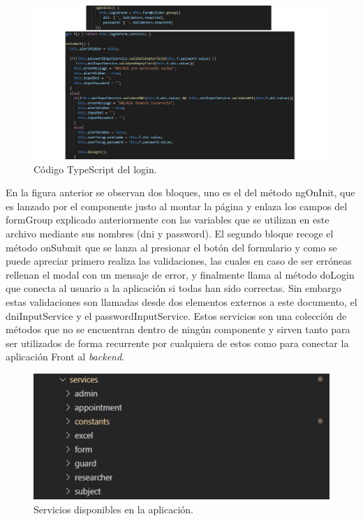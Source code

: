    \begin{figure}[h]
    \centering
     \includegraphics[width=1\textwidth]{images/loginTS.jpg}
    \caption{Código TypeScript del login.}
    \end{figure}
    \FloatBarrier
    
    En la figura anterior se observan dos bloques, uno es el del método ngOnInit, que es lanzado por el componente justo al montar la página y enlaza los campos del formGroup explicado anteriormente con las variables que se utilizan en este archivo mediante sus nombres (dni y password). El segundo bloque recoge el método onSubmit que se lanza al presionar el botón del formulario y como se puede apreciar primero realiza las validaciones, las cuales en caso de ser erróneas rellenan el modal con un mensaje de error, y finalmente llama al método doLogin que conecta al usuario a la aplicación si todas han sido correctas. Sin embargo estas validaciones son llamadas desde dos elementos externos a este documento, el dniInputService y el passwordInputService. Estos servicios son una colección de métodos que no se encuentran dentro de ningún componente y  sirven tanto para ser utilizados de forma recurrente por cualquiera de estos como para conectar la aplicación Front al \textit{backend}.
    
    \begin{figure}[h]
    \centering
     \includegraphics[width=1\textwidth]{images/services.jpg}
    \caption{Servicios disponibles en la aplicación.}
    \end{figure}
    \FloatBarrier
    
